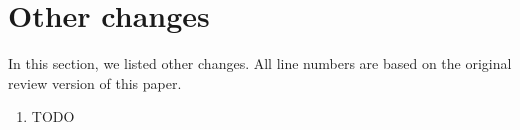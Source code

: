 \section*{Other changes}

In this section, we listed other changes. All line numbers are based
on the original review version of this paper.

\begin{enumerate}
\item TODO
\end{enumerate}
